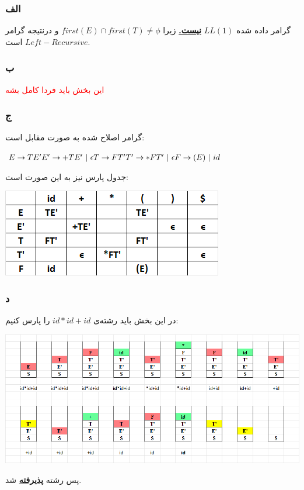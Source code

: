 \subsubsection*{الف}
گرامر داده شده 
$LL(1)$
\textbf{\underline{نیست.}}
زیرا 
$first(E)\cap first(T) \neq \phi$
و درنتیجه گرامر 
$Left-Recursive$
است.

\subsubsection*{ب}

\textcolor{red}{این بخش باید فردا کامل بشه}


\subsubsection*{ج}
گرامر اصلاح شده به صورت مقابل است:

\setLTR
$
E \rightarrow TE' \\ 
E' \rightarrow +TE' \ | \ \epsilon \\
T \rightarrow FT' \\
T' \rightarrow *FT' \ | \ \epsilon \\
F \rightarrow (E) \ | \ id
$
\setRTL

جدول پارس نیز به این صورت است:

\qquad\qquad\qquad\qquad\qquad\includegraphics[width=0.5\linewidth]{figs/3.png}

\pagebreak
\subsubsection*{د}

در این بخش باید رشته‌ی 
$id *id+id$
را پارس کنیم:

\qquad\qquad\qquad\qquad\qquad\includegraphics[width=1\linewidth]{figs/4.png}

پس رشته 
\textbf{\underline{پذیرفته}}
 شد.
